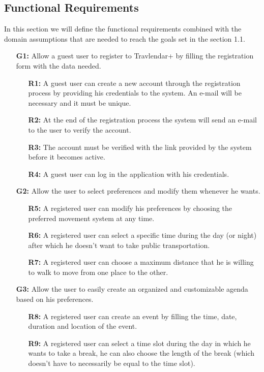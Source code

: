 \documentclass{article}
\begin{document}
\subsection{Functional Requirements}
In this section we will define the functional requirements combined with the domain assumptions that are needed to reach the goals set in the section 1.1.
\begin{enumerate}
\item[\textbf{G1:}] Allow a guest user to register to Travlendar+ by filling the registration form with the data needed.
\begin{enumerate}
\item[\textbf{R1:}] A guest user can create a new account through the registration process by providing his credentials to the system. An e-mail will be necessary and it must be unique.
\item[\textbf{R2:}] At the end of the registration process the system will send an e-mail to the user to verify the account.
\item[\textbf{R3:}] The account must be verified with the link provided by the system before it becomes active.
\item[\textbf{R4:}] A guest user can log in the application with his credentials.
\end{enumerate}
\item[\textbf{G2:}] Allow the user to select preferences and modify them whenever he wants.
\begin{enumerate}
\item[\textbf{R5:}] A registered user can modify his preferences by choosing the preferred movement system at any time.
\item[\textbf{R6:}] A registered user can select a specific time during the day (or night) after which he doesn't want to take public transportation.
\item[\textbf{R7:}] A registered user can choose a maximum distance that he is willing to walk to move from one place to the other.
\end{enumerate}
\item[\textbf{G3:}] Allow the user to easily create an organized and customizable agenda based on his preferences.
\begin{enumerate}
\item[\textbf{R8:}] A registered user can create an event by filling the time, date, duration and location of the event.
\item[\textbf{R9:}] A registered user can select a time slot during the day in which he wants to take a break, he can also choose the length of the break (which doesn't have to necessarily be equal to the time slot).

\end{enumerate}
\end{enumerate}
\end{document}
